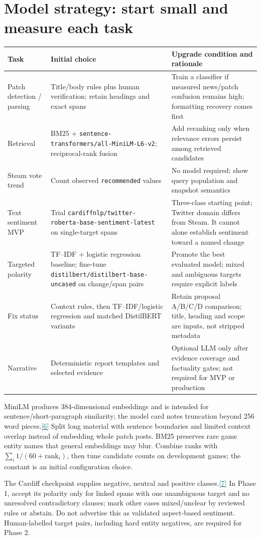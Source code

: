 \documentclass[10pt,letterpaper]{article}
\newcommand{\sr}[1]{\hyperlink{src#1}{\textcolor{teal}{[#1]}}}
\newcommand{\nextsection}[1]{\clearpage\section{#1}}
\begin{document}
\nextsection{Model strategy: start small and measure each task}
\begin{tabularx}{\linewidth}{p{0.9in}YY}
\toprule
Task & Initial choice & Upgrade condition and rationale \\
\midrule
Patch detection / parsing & Title/body rules plus human verification; retain headings and exact spans & Train a classifier if measured news/patch confusion remains high; formatting recovery comes first \\
Retrieval & BM25 + \texttt{sentence-transformers/all-MiniLM-L6-v2}; reciprocal-rank fusion & Add reranking only when relevance errors persist among retrieved candidates \\
Steam vote trend & Count observed \texttt{recommended} values & No model required; show query population and snapshot semantics \\
Text sentiment MVP & Trial \nolinkurl{cardiffnlp/twitter-roberta-base-sentiment-latest} on single-target spans & Three-class starting point; Twitter domain differs from Steam. It cannot alone establish sentiment toward a named change \\
Targeted polarity & TF--IDF + logistic regression baseline; fine-tune \texttt{distilbert/distilbert-base-uncased} on change/span pairs & Promote the best evaluated model; mixed and ambiguous targets require explicit labels \\
Fix status & Context rules, then TF--IDF/logistic regression and matched DistilBERT variants & Retain proposal A/B/C/D comparison; title, heading and scope are inputs, not stripped metadata \\
Narrative & Deterministic report templates and selected evidence & Optional LLM only after evidence coverage and factuality gates; not required for MVP or production \\
\bottomrule
\end{tabularx}

MiniLM produces 384-dimensional embeddings and is intended for sentence/short-paragraph similarity; the model card notes truncation beyond 256 word pieces.\sr{6} Split long material with sentence boundaries and limited context overlap instead of embedding whole patch posts. BM25 preserves rare game entity names that general embeddings may blur. Combine ranks with $\sum_i 1/(60+\mathrm{rank}_i)$, then tune candidate counts on development games; the constant is an initial configuration choice.

The Cardiff checkpoint supplies negative, neutral and positive classes.\sr{7} In Phase 1, accept its polarity only for linked spans with one unambiguous target and no unresolved contradictory clauses; mark other cases mixed/unclear by reviewed rules or abstain. Do not advertise this as validated aspect-based sentiment. Human-labelled target pairs, including hard entity negatives, are required for Phase 2.
\end{document}
